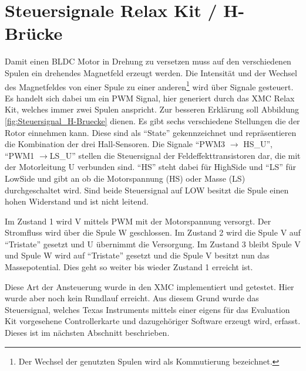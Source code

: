 \section{Steuersignale Relax Kit / H-Brücke}
Damit einen BLDC Motor in Drehung zu versetzen muss auf den verschiedenen Spulen ein drehendes Magnetfeld erzeugt werden.
Die Intensität und der Wechsel des Magnetfeldes von einer Spule zu einer anderen\footnote{Der Wechsel der genutzten Spulen wird als Kommutierung bezeichnet.} wird über Signale gesteuert.
Es handelt sich dabei um ein PWM Signal, hier generiert durch das XMC Relax Kit, welches immer zwei Spulen anspricht.
Zur besseren Erklärung soll Abbildung \ref{fig:Steuersignal_H-Bruecke} dienen.
Es gibt sechs verschiedene Stellungen die der Rotor einnehmen kann.
Diese sind als \enquote{State} gekennzeichnet und repräsentieren die Kombination der drei Hall-Sensoren.
Die Signale \enquote{PWM3 $\rightarrow$ HS\_U}, \enquote{PWM1 $\rightarrow$LS\_U} stellen die Steuersignal der Feldeffekttransistoren dar, die mit der Motorleitung U verbunden sind.
\enquote{HS} steht dabei für HighSide und \enquote{LS} für LowSide und gibt an ob die Motorspannung (HS) oder Masse (LS) durchgeschaltet wird.
Sind beide Steuersignal auf LOW besitzt die Spule einen hohen Widerstand und ist nicht leitend.

Im Zustand 1 wird V mittels PWM mit der Motorspannung versorgt.
Der Stromfluss wird über die Spule W geschlossen.
Im Zustand 2 wird die Spule V auf \enquote{Tristate} gesetzt und U übernimmt die Versorgung.
Im Zustand 3 bleibt Spule V und Spule W wird auf \enquote{Tristate} gesetzt und die Spule V besitzt nun das Massepotential.
Dies geht so weiter bis wieder Zustand 1 erreicht ist.

Diese Art der Ansteuerung wurde in den XMC implementiert und getestet.
Hier wurde aber noch kein Rundlauf erreicht. 
Aus diesem Grund wurde das Steuersignal, welches Texas Instruments mittels einer eigens für das Evaluation Kit vorgesehene Controllerkarte und dazugehöriger Software erzeugt wird, erfasst.
Dieses ist im nächsten Abschnitt beschrieben.

